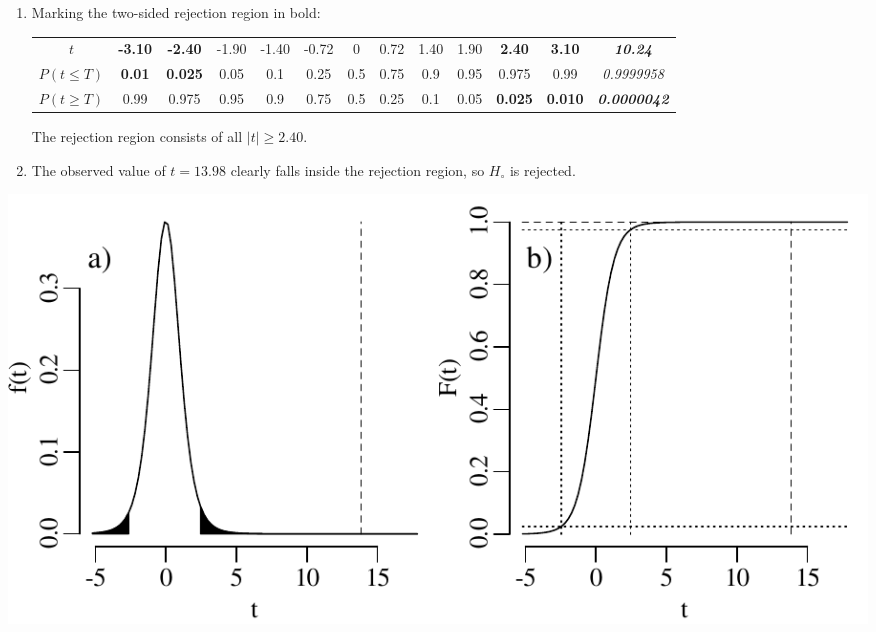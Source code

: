 \begin{enumerate}
\item Marking the two-sided rejection region in bold:
  
  \begin{center}
    \begin{tabular}{c|c@{\gap}c@{\gap}c@{\gap}c@{\gap}
        c@{\gap}c@{\gap}c@{\gap}c@{\gap}c@{\gap}c@{\gap}c@{\gap}c}
      $t$ & \textbf{-3.10} & \textbf{-2.40} & -1.90 & -1.40 & -0.72 &
      0 & 0.72 & 1.40 & 1.90 & \textbf{2.40} &
      \textbf{3.10} & \textbf{\emph{10.24}}\\
      $P(t\leq{T})$ & \textbf{0.01} & \textbf{0.025} & 0.05 & 0.1 & 0.25 &
      0.5 & 0.75 & 0.9 & 0.95 & 0.975 & 0.99 & \emph{0.9999958}\\
      $P(t\geq{T})$ & 0.99 & 0.975 & 0.95 & 0.9 & 0.75 & 0.5 &
      0.25 & 0.1 & 0.05 & \textbf{0.025} & \textbf{0.010} &
      \textbf{\emph{0.0000042}}
    \end{tabular}
  \end{center}

  The rejection region consists of all $|t|\geq{2.40}$.

\item The observed value of $t=13.98$ clearly falls inside the
  rejection region, so $H_\circ$ is rejected.
  
\end{enumerate}

\noindent\begin{minipage}[t][][b]{.6\textwidth}
  \includegraphics[width=\textwidth]{../figures/tr.pdf}\\
\end{minipage}
\begin{minipage}[t][][t]{.4\textwidth}
  \label{fig:tr}
\end{minipage}

